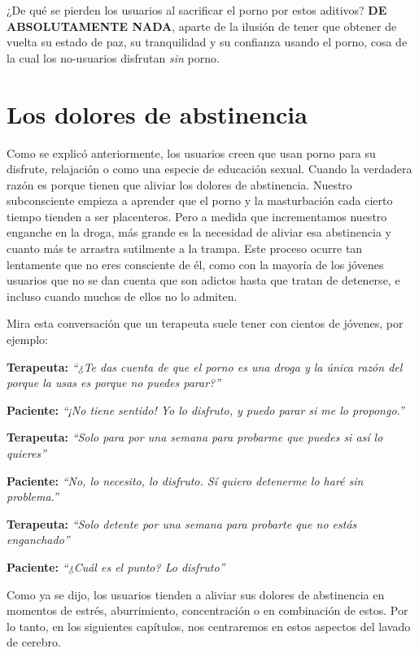 \documentclass[
  spanish,
  openany]{book}
\begin{document}
¿De qué se pierden los usuarios al sacrificar el porno por estos aditivos? \textbf{DE ABSOLUTAMENTE NADA}, aparte de la ilusión de tener que obtener de vuelta su estado de paz, su tranquilidad y su confianza usando el porno, cosa de la cual los no-usuarios disfrutan \emph{sin} porno.

\hypertarget{los-dolores-de-abstinencia}{%
\section{Los dolores de abstinencia}\label{los-dolores-de-abstinencia}}

Como se explicó anteriormente, los usuarios creen que usan porno para su disfrute, relajación o como una especie de educación sexual. Cuando la verdadera razón es porque tienen que aliviar los dolores de abstinencia. Nuestro subconsciente empieza a aprender que el porno y la masturbación cada cierto tiempo tienden a ser placenteros. Pero a medida que incrementamos nuestro enganche en la droga, más grande es la necesidad de aliviar esa abstinencia y cuanto más te arrastra sutilmente a la trampa. Este proceso ocurre tan lentamente que no eres consciente de él, como con la mayoría de los jóvenes usuarios que no se dan cuenta que son adictos hasta que tratan de detenerse, e incluso cuando muchos de ellos no lo admiten.

Mira esta conversación que un terapeuta suele tener con cientos de jóvenes, por ejemplo:

\textbf{Terapeuta:} \emph{``¿Te das cuenta de que el porno es una droga y la única razón del porque la usas es porque no puedes parar?''}

\textbf{Paciente:} \emph{``¡No tiene sentido! Yo lo disfruto, y puedo parar si me lo propongo.''}

\textbf{Terapeuta:} \emph{``Solo para por una semana para probarme que puedes si así lo quieres''}

\textbf{Paciente:} \emph{``No, lo necesito, lo disfruto. Sí quiero detenerme lo haré sin problema.''}

\textbf{Terapeuta:} \emph{``Solo detente por una semana para probarte que no estás enganchado''}

\textbf{Paciente:} \emph{``¿Cuál es el punto? Lo disfruto''}

Como ya se dijo, los usuarios tienden a aliviar sus dolores de abstinencia en momentos de estrés, aburrimiento, concentración o en combinación de estos. Por lo tanto, en los siguientes capítulos, nos centraremos en estos aspectos del lavado de cerebro.
\end{document}
